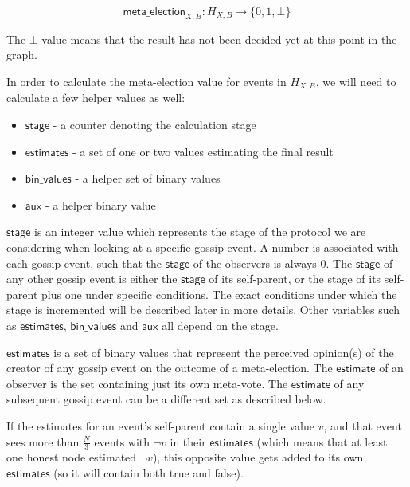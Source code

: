 \documentclass[a4paper,fleqn]{article}
\begin{document}
\[ \mathsf{meta\_election}_{X,B}: H_{X,B} \to \{0, 1, \bot\} \]

The $\bot$ value means that the result has not been decided yet at this point in the graph.

In order to calculate the meta-election value for events in $H_{X,B}$, we will need to calculate a
few helper values as well:

\begin{itemize}
	\item $\mathsf{stage}$ - a counter denoting the calculation stage
	\item $\mathsf{estimates}$ - a set of one or two values estimating the final result
	\item $\mathsf{bin\_values}$ - a helper set of binary values
	\item $\mathsf{aux}$ - a helper binary value
\end{itemize}

$\mathsf{stage}$ is an integer value which represents the stage of the protocol we are considering
when looking at a specific gossip event. A number is associated with each gossip event, such that
the $\mathsf{stage}$ of the observers is always 0. The $\mathsf{stage}$ of any other gossip event
is either the $\mathsf{stage}$ of its self-parent, or the stage of its self-parent plus one under 
specific conditions. The exact conditions under which the stage is incremented will be described
later in more details. Other variables such as $\mathsf{estimates}$, $\mathsf{bin\_values}$ and
$\mathsf{aux}$ all depend on the stage.

$\mathsf{estimates}$ is a set of binary values that represent the perceived opinion(s) of the
creator of any gossip event on the outcome of a meta-election. The $\mathsf{estimate}$ of an
observer is the set containing just its own meta-vote. The $\mathsf{estimate}$ of any subsequent
gossip event can be a different set as described below.

If the estimates for an event's self-parent contain a single value $v$, and that event sees more 
than $\frac{N}{3}$ events with $\neg v$ in their $\mathsf{estimates}$ (which means that at least
one honest node estimated $\neg v$), this opposite value gets added to its own $\mathsf{estimates}$
(so it will contain both true and false).
\end{document}
